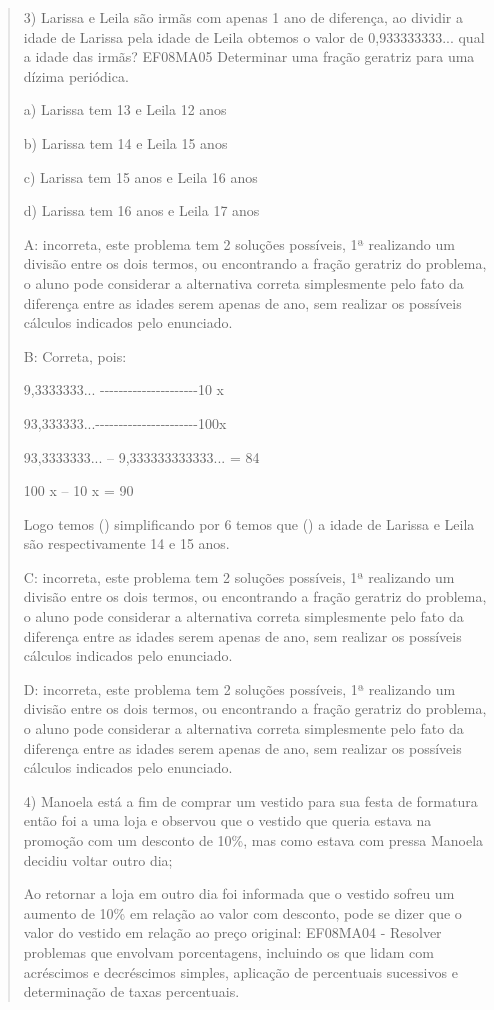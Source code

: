 \begin{quote}
\begin{escolha}
3) Larissa e Leila são irmãs com apenas 1 ano de diferença, ao dividir a
idade de Larissa pela idade de Leila obtemos o valor de 0,933333333...
qual a idade das irmãs? EF08MA05 Determinar uma fração geratriz para uma
dízima periódica.

a) Larissa tem 13 e Leila 12 anos

b) Larissa tem 14 e Leila 15 anos

c) Larissa tem 15 anos e Leila 16 anos

d) Larissa tem 16 anos e Leila 17 anos

A: incorreta, este problema tem 2 soluções possíveis, 1ª realizando um
divisão entre os dois termos, ou encontrando a fração geratriz do
problema, o aluno pode considerar a alternativa correta simplesmente
pelo fato da diferença entre as idades serem apenas de ano, sem realizar
os possíveis cálculos indicados pelo enunciado.

B: Correta, pois:

9,3333333...
-\/-\/-\/-\/-\/-\/-\/-\/-\/-\/-\/-\/-\/-\/-\/-\/-\/-\/-\/-\/-10 x

93,333333...-\/-\/-\/-\/-\/-\/-\/-\/-\/-\/-\/-\/-\/-\/-\/-\/-\/-\/-\/-\/-\/-100x

93,3333333... -- 9,333333333333... = 84

100 x -- 10 x = 90

Logo temos () simplificando por 6 temos que
() a idade de Larissa e Leila são respectivamente 14 e 15
anos.

C: incorreta, este problema tem 2 soluções possíveis, 1ª realizando um
divisão entre os dois termos, ou encontrando a fração geratriz do
problema, o aluno pode considerar a alternativa correta simplesmente
pelo fato da diferença entre as idades serem apenas de ano, sem realizar
os possíveis cálculos indicados pelo enunciado.

D: incorreta, este problema tem 2 soluções possíveis, 1ª realizando um
divisão entre os dois termos, ou encontrando a fração geratriz do
problema, o aluno pode considerar a alternativa correta simplesmente
pelo fato da diferença entre as idades serem apenas de ano, sem realizar
os possíveis cálculos indicados pelo enunciado.

4) Manoela está a fim de comprar um vestido para sua festa de formatura
então foi a uma loja e observou que o vestido que queria estava na
promoção com um desconto de 10\%, mas como estava com pressa Manoela
decidiu voltar outro dia;

Ao retornar a loja em outro dia foi informada que o vestido sofreu um
aumento de 10\% em relação ao valor com desconto, pode se dizer que o
valor do vestido em relação ao preço original: EF08MA04 - Resolver
problemas que envolvam porcentagens, incluindo os que lidam com
acréscimos e decréscimos simples, aplicação de percentuais sucessivos e
determinação de taxas percentuais.


\end{escolha}
\end{quote}
